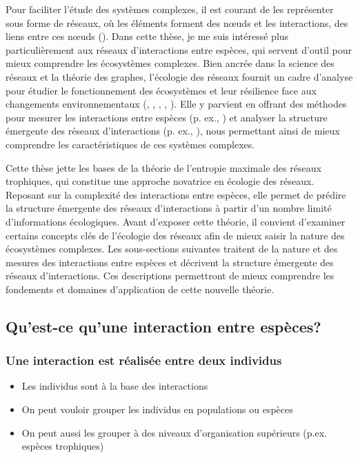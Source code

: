 Pour faciliter l'étude des systèmes complexes, il est courant de les représenter
sous forme de réseaux, où les éléments forment des nœuds et les interactions,
des liens entre ces nœuds (\cite{Newman2003Structure}). Dans cette thèse, je me
suis intéressé plus particulièrement aux réseaux d'interactions entre espèces,
qui servent d'outil pour mieux comprendre les écosystèmes complexes. Bien ancrée
dans la science des réseaux et la théorie des graphes, l'écologie des réseaux
fournit un cadre d'analyse pour étudier le fonctionnement des écosystèmes et
leur résilience face aux changements environnementaux (\cite{Proulx2005Network},
\cite{McCann2007Protecting}, \cite{McCann2011Food},
\cite{Rooney2012Integrating}, \cite{Valiente-Banuet2019Species}). Elle y
parvient en offrant des méthodes pour mesurer les interactions entre espèces (p.
ex., \cite{Jordano2016Sampling}) et analyser la structure émergente des réseaux
d'interactions (p. ex., \cite{Delmas2019Analysing}), nous permettant ainsi de
mieux comprendre les caractéristiques de ces systèmes complexes. 

Cette thèse jette les bases de la théorie de l'entropie maximale des réseaux
trophiques, qui constitue une approche novatrice en écologie des réseaux.
Reposant sur la complexité des interactions entre espèces, elle permet de
prédire la structure émergente des réseaux d'interactions à partir d'un nombre
limité d'informations écologiques. Avant d'exposer cette théorie, il convient
d'examiner certains concepts clés de l'écologie des réseaux afin de mieux saisir
la nature des écosystèmes complexes. Les sous-sections suivantes traitent de
la nature et des mesures des interactions entre espèces et décrivent la
structure émergente des réseaux d'interactions. Ces descriptions permettront de
mieux comprendre les fondements et domaines d'application de cette nouvelle
théorie.  

\subsection{Qu'est-ce qu'une interaction entre espèces?} 

\subsubsection{Une interaction est réalisée entre deux individus} 

\begin{itemize}
    \item Les individus sont à la base des interactions
    \item On peut vouloir grouper les individus en populations ou espèces
    \item On peut aussi les grouper à des niveaux d'organisation supérieurs (p.ex. espèces trophiques)
\end{itemize}

